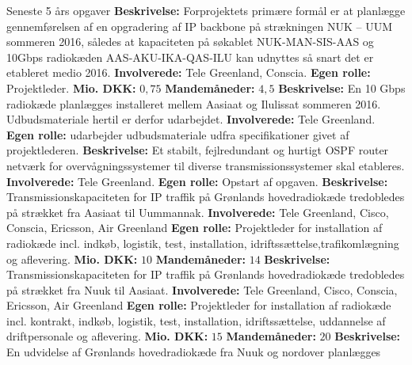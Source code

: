 \begin{rubric}{Seneste 5 års opgaver}
%
\entry*[sep 2015 -] \textbf{Beskrivelse:} Forprojektets primære formål er at planlægge gennemførelsen af en opgradering af IP backbone på strækningen NUK – UUM sommeren 2016, således at kapaciteten på søkablet NUK-MAN-SIS-AAS og 10Gbps radiokæden AAS-AKU-IKA-QAS-ILU kan udnyttes så snart det er etableret medio 2016.
\entry* \textbf{Involverede:} Tele Greenland, Conscia.
\entry* \textbf{Egen rolle:} Projektleder.
\entry* \textbf{Mio. DKK:} $0,75$
\entry* \textbf{Mandemåneder:} $4,5$
%
 \textbf{Beskrivelse:} En 10 Gbps radiokæde planlægges installeret mellem Aasiaat og Ilulissat sommeren 2016. Udbudsmateriale hertil er derfor udarbejdet.
\entry* \textbf{Involverede:} Tele Greenland.
\entry* \textbf{Egen rolle:} udarbejder udbudsmateriale udfra specifikationer givet af projektlederen.
%
\entry*[maj 2015 - ] \textbf{Beskrivelse:} Et stabilt, fejlredundant og hurtigt OSPF router netværk for overvågningssystemer til diverse transmissionssystemer skal etableres.
\entry* \textbf{Involverede:} Tele Greenland.
\entry* \textbf{Egen rolle:} Opstart af opgaven.
%
 \textbf{Beskrivelse:} Transmissionskapaciteten for IP traffik på Grønlands hovedradiokæde tredobledes på strækket fra Aasiaat til Uummannak.
\entry* \textbf{Involverede:} Tele Greenland, Cisco, Conscia, Ericsson, Air Greenland
\entry* \textbf{Egen rolle:} Projektleder for installation af radiokæde incl. indkøb, logistik, test, installation, idriftssættelse,trafikomlægning og aflevering.
\entry* \textbf{Mio. DKK:} $10$
\entry* \textbf{Mandemåneder:} $14$
%
 \textbf{Beskrivelse:} Transmissionskapaciteten for IP traffik på Grønlands hovedradiokæde tredobledes på strækket fra Nuuk til Aasiaat.
\entry* \textbf{Involverede:} Tele Greenland, Cisco, Conscia, Ericsson, Air Greenland
\entry* \textbf{Egen rolle:} Projektleder for installation af radiokæde incl. kontrakt, indkøb, logistik, test, installation, idriftssættelse, uddannelse af driftpersonale og aflevering.
\entry* \textbf{Mio. DKK:} $15$
\entry* \textbf{Mandemåneder:} $20$
%
 \textbf{Beskrivelse:} En udvidelse af Grønlands hovedradiokæde fra Nuuk og nordover planlægges

\end{rubric}
